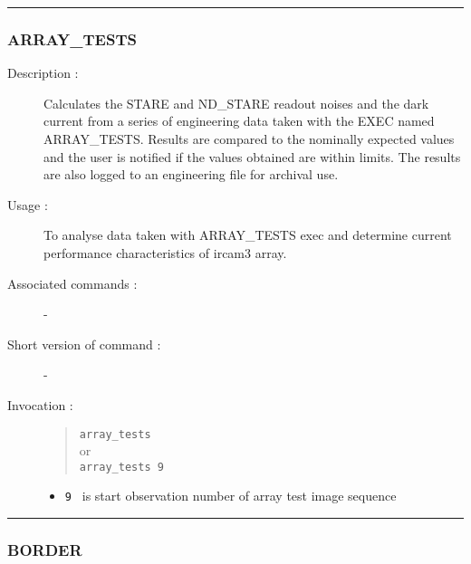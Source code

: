 \hrule 
\subsubsection*{\label{ARRAY_TESTS}ARRAY\_TESTS}

\begin{description}

\item[Description :] Calculates the STARE and ND\_STARE readout noises and
the dark current from a series of engineering data taken with the EXEC
named ARRAY\_TESTS\@.  Results are compared to the nominally expected
values and the user is notified if the values obtained are within limits. 
The results are also logged to an engineering file for archival use. 

\item[Usage :] To analyse data taken with ARRAY\_TESTS exec and
determine current performance characteristics of {\sc ircam3} array. 

\item[Associated commands :] -
\item[Short version of command :] -
\item[Invocation :]

\begin{quote}{\tt  array\_tests }\\
or \\
{\tt array\_tests 9 }
\end{quote}

\begin{itemize}

\item {\tt 9 } is start observation number of array test image sequence

\end{itemize}

\end{description}

\hrule 
\subsubsection*{\label{BORDER}BORDER}


